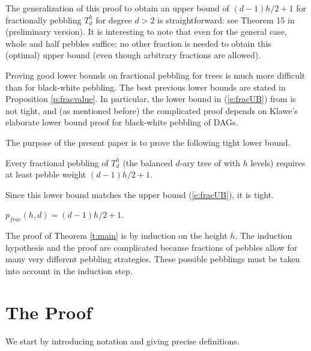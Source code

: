 \documentclass[oribib1]{llncs}
\begin{document}
The generalization of this proof to obtain an upper bound of
$(d-1)h/2+1$ for fractionally pebbling $T^h_d$ for degree $d>2$ is
straightforward: see Theorem 15 in \cite{c:pebjournal} (preliminary
version).  It is interesting to note that even for the general case,
whole and half pebbles suffice:  no other fraction is needed to
obtain this (optimal) upper bound (even though arbitrary fractions
are allowed).

Proving good lower bounds on fractional pebbling for trees is much more
difficult than for black-white pebbling.  The best previous lower
bounds are stated in Proposition \ref{p:fracvalue}.   In particular,
the lower bound in (\ref{e:fracUB}) from \cite{c:pebjournal} is not tight,
and (as mentioned before)
the complicated proof depends on Klawe's \cite{k:bwpyr}
elaborate lower bound proof for black-white pebbling of DAGs. 

The purpose of the present paper is to prove the
following tight lower bound.

\begin{theorem}\label{t:main}
Every fractional pebbling of $T^h_d$ (the balanced $d$-ary tree of 
with $h$ levels) requires at least pebble weight $(d-1)h/2+1$.
\end{theorem}

Since this lower bound matches the upper bound (\ref{e:fracUB}),
it is tight.

\begin{corollary}\label{c:tight}
$p_{frac}(h,d) = (d-1)h/2+1$.
\end{corollary}

The proof of Theorem \ref{t:main} is by induction on the height $h$.
The induction hypothesis and the proof are complicated because
fractions of pebbles
allow for many very different pebbling strategies. These possible
pebblings must be taken into account in the induction step.


\section{The Proof}\label{s:proof}

We start by introducing notation and giving precise definitions.
\end{document}
